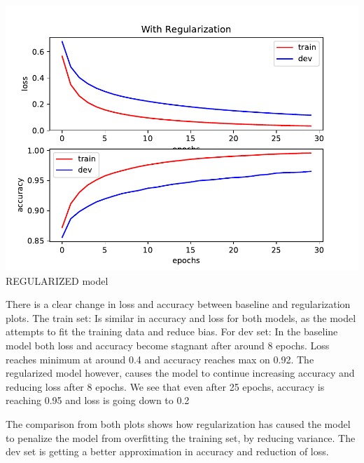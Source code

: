 \begin{answer}

\centering
\includegraphics[width=6in]{regularized.pdf} 
REGULARIZED model



There is a clear change in loss and accuracy between baseline and regularization plots.
The train set:
Is similar in accuracy and loss for both models, as the model attempts to fit the training data and reduce bias.
For dev set:
In the baseline model both loss and accuracy become stagnant after around 8 epochs. Loss reaches minimum at around 0.4 and accuracy reaches max on 0.92.
The regularized model however, causes the model to continue increasing accuracy and reducing loss after 8 epochs.
We see that even after 25 epochs, accuracy is reaching 0.95 and loss is going down to 0.2

The comparison from both plots shows how regularization has caused the model to penalize the model from overfitting the training set, by reducing variance. The dev set is getting a better approximation in accuracy and reduction of loss.

   
\end{answer}
   